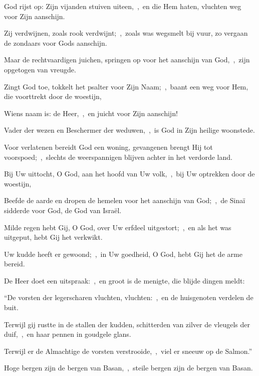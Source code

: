 \documentclass[12pt,twoside,a5paper]{article}
\begin{document}
\begin{halfparskip}

   God rijst op: Zijn vijanden stuiven uiteen,~\sep\ en die Hem haten, vluchten weg voor Zijn aanschijn.


  Zij verdwijnen, zoals rook verdwijnt;~\sep\ zoals was wegsmelt bij vuur, zo vergaan de zondaars voor Gods
  aanschijn.

  Maar de rechtvaardigen juichen, springen op voor het aanschijn van God,~\sep\ zijn opgetogen van vreugde.

  Zingt God toe, tokkelt het psalter voor Zijn Naam;~\sep\ baant een weg voor Hem, die voorttrekt door de woestijn,

  Wiens naam is: de Heer,~\sep\ en juicht voor Zijn aanschijn!

  Vader der wezen en Beschermer der weduwen,~\sep\ is God in Zijn heilige woonstede.

  Voor verlatenen bereidt God een woning, gevangenen brengt Hij tot voorspoed;~\sep\ slechts de weerspannigen blijven achter in het verdorde land.

  Bij Uw uittocht, O God, aan het hoofd van Uw volk,~\sep\ bij Uw optrekken door de woestijn,

  Beefde de aarde en dropen de hemelen voor het aanschijn van God;~\sep\ de Sinaï sidderde voor God, de God van Israël.

  Milde regen hebt Gij, O God, over Uw erfdeel uitgestort;~\sep\ en als het was uitgeput, hebt Gij het verkwikt.

  Uw kudde heeft er gewoond;~\sep\ in Uw goedheid, O God, hebt Gij het de arme bereid.

  De Heer doet een uitspraak:~\sep\ en groot is de menigte, die blijde dingen meldt:

  ``De vorsten der legerscharen vluchten, vluchten:~\sep\ en de huisgenoten verdelen de buit.

  Terwijl gij rustte in de stallen der kudden, schitterden van zilver de vleugels der duif,~\sep\ en haar pennen in goudgele glans.

  Terwijl er de Almachtige de vorsten verstrooide,~\sep\ viel er sneeuw op de Salmon.''

  Hoge bergen zijn de bergen van Basan,~\sep\ steile bergen zijn de bergen van Basan.


\end{halfparskip}
\end{document}
